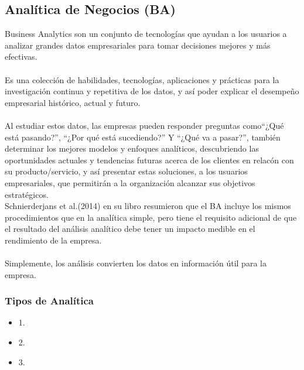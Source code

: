 \documentclass[preprint,12pt]{elsarticle}
\begin{document}
	\subsection{\textbf{Analítica de Negocios (BA) }}
	Business Analytics son un conjunto de tecnologías que ayudan a los usuarios a analizar grandes datos empresariales para tomar decisiones mejores y más efectivas. \\\\
Es una colección de habilidades, tecnologías, aplicaciones y prácticas para la investigación continua y repetitiva de los datos, y así poder explicar el desempeño empresarial histórico, actual y futuro\cite{referenciasosa1}.\\
\\Al estudiar estos datos, las empresas pueden responder preguntas como“¿Qué está pasando?”, “¿Por qué está sucediendo?” Y “¿Qué va a pasar?”\cite{referenciasosa3}, también determinar los mejores modelos y enfoques analíticos, descubriendo las oportunidades actuales y tendencias futuras acerca de los clientes en relacón con su producto/servicio, y así presentar estas soluciones, a los usuarios empresariales, que permitirán a la organización alcanzar sus objetivos estratégicos.\\
Schnierderjans et al.(2014) en su libro resumieron que el BA incluye los mismos procedimientos que en la analítica simple, pero tiene el requisito adicional de que el resultado del análisis analítico debe tener un impacto medible en el rendimiento de la empresa. \cite{referenciasosa2} \\
\\Simplemente, los análisis convierten los datos en información útil para la empresa.

	\subsubsection{\textbf{Tipos de Analítica }}
	\begin{itemize}
	\item 1. 
	\item 2. 
	\item 3. 
	\end{itemize}
\end{document}
